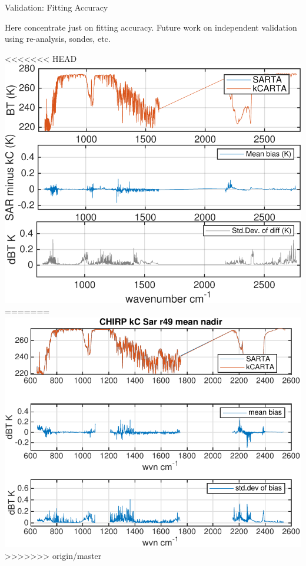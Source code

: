 \documentclass[10pt,t]{beamer}
\begin{document}
\begin{frame}[shrink=5]{Validation: Fitting Accuracy}

Here concentrate just on fitting accuracy.  Future work on independent validation using re-analysis, sondes, etc.

      \begin{center}
<<<<<<< HEAD
    \includegraphics[width=0.6\linewidth]{./Figs/kc_sar_airs_l1c_mean_bias_stdv_sea_6angs_aslp.png}
=======
    \includegraphics[width=0.6\linewidth]{./Figs/chirp_49regr_sar_kc_bias_stdv.pdf}
>>>>>>> origin/master
  \end{center}
  

\end{frame}
\end{document}
